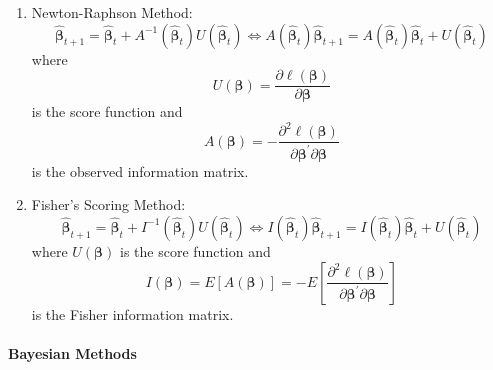 \begin{enumerate}
    \item Newton-Raphson Method:
          \begin{equation}
              \hat{\boldsymbol{\beta}}_{t+1}=\hat{\boldsymbol{\beta}}_{t}+A^{-1}\left(\hat{\boldsymbol{\beta}}_{t}\right)U\left(\hat{\boldsymbol{\beta}}_{t}\right)\Leftrightarrow A\left(\hat{\boldsymbol{\beta}}_{t}\right)\hat{\boldsymbol{\beta}}_{t+1}=A\left(\hat{\boldsymbol{\beta}}_{t}\right)\hat{\boldsymbol{\beta}}_{t}+U\left(\hat{\boldsymbol{\beta}}_{t}\right)
          \end{equation}
          where
          \begin{equation}
              U\left(\boldsymbol{\beta}\right)=\frac{\partial\ell\left(\boldsymbol{\beta}\right)}{\partial\boldsymbol{\beta}}
          \end{equation}
          is the score function and
          \begin{equation}
              A\left(\boldsymbol{\beta}\right)=-\frac{\partial^{2}\ell\left(\boldsymbol{\beta}\right)}{\partial\boldsymbol{\beta}^{\prime}\partial\boldsymbol{\beta}}
          \end{equation}
          is the observed information matrix.
    \item Fisher’s Scoring Method:
          \begin{equation}
              \hat{\boldsymbol{\beta}}_{t+1}=\hat{\boldsymbol{\beta}}_{t}+I^{-1}\left(\hat{\boldsymbol{\beta}}_{t}\right)U\left(\hat{\boldsymbol{\beta}}_{t}\right)\Leftrightarrow I\left(\hat{\boldsymbol{\beta}}_{t}\right)\hat{\boldsymbol{\beta}}_{t+1}=I\left(\hat{\boldsymbol{\beta}}_{t}\right)\hat{\boldsymbol{\beta}}_{t}+U\left(\hat{\boldsymbol{\beta}}_{t}\right)
          \end{equation}
          where $U\left(\boldsymbol{\beta}\right)$ is the score function and
          \begin{equation}
              I\left(\boldsymbol{\beta}\right)=E\left[A\left(\boldsymbol{\beta}\right)\right]=-E\left[\frac{\partial^{2}\ell\left(\boldsymbol{\beta}\right)}{\partial\boldsymbol{\beta}^{\prime}\partial\boldsymbol{\beta}}\right]
          \end{equation}
          is the Fisher information matrix.
\end{enumerate}

\paragraph{Bayesian Methods}

